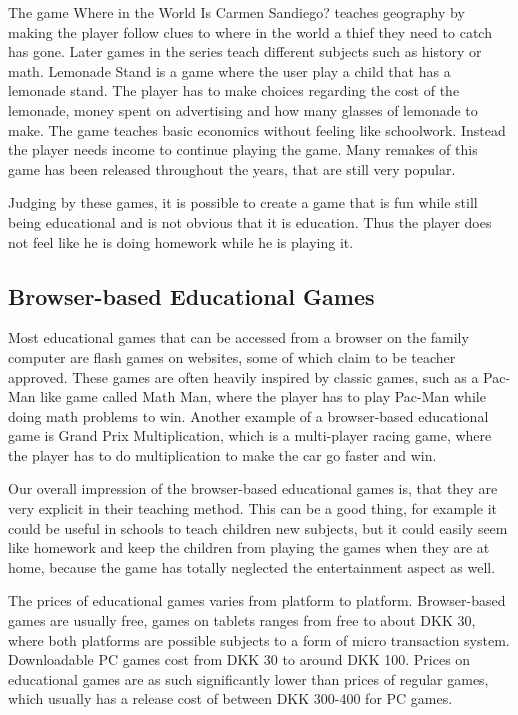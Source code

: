 The game Where in the World Is Carmen Sandiego? teaches geography by making the player follow clues to where in the world a thief they need to catch has gone.
Later games in the series teach different subjects such as history or math.
Lemonade Stand is a game where the user play a child that has a lemonade stand.
The player has to make choices regarding the cost of the lemonade, money spent on advertising and how many glasses of lemonade to make.
The game teaches basic economics without feeling like schoolwork. Instead the player needs income to continue playing the game.
Many remakes of this game has been released throughout the years, that are still very popular.

Judging by these games, it is possible to create a game that is fun while still being educational and is not obvious that it is education. Thus the player does not feel like he is doing homework while he is playing it.

\subsection{Browser-based Educational Games}
Most educational games that can be accessed from a browser on the family computer are flash games on websites, some of which claim to be teacher 
approved.
These games are often heavily inspired by classic games, such as a Pac-Man like game called Math Man, where the player has to play Pac-Man while doing 
math problems to win.\cite{mathman} Another example of a browser-based educational game is Grand Prix Multiplication, which is a multi-player racing 
game, where the player has to do multiplication to make the car go faster and win.\cite{grandprix}\newline

Our overall impression of the browser-based educational games is, that they are very explicit in their teaching method.
This can be a good thing, for example it could be useful in schools to teach children new subjects, but it could easily seem like homework and keep the children from playing the games when they are at home, because the game has totally neglected the entertainment aspect as well.\newline

The prices of educational games varies from platform to platform. 
Browser-based games are usually free, games on tablets ranges from free to about DKK 30, where both platforms are possible subjects to a form of micro transaction system.
Downloadable PC games cost from DKK 30 to around DKK 100.
Prices on educational games are as such significantly lower than prices of regular games, which usually has a release cost of between DKK 300-400 for PC games.

